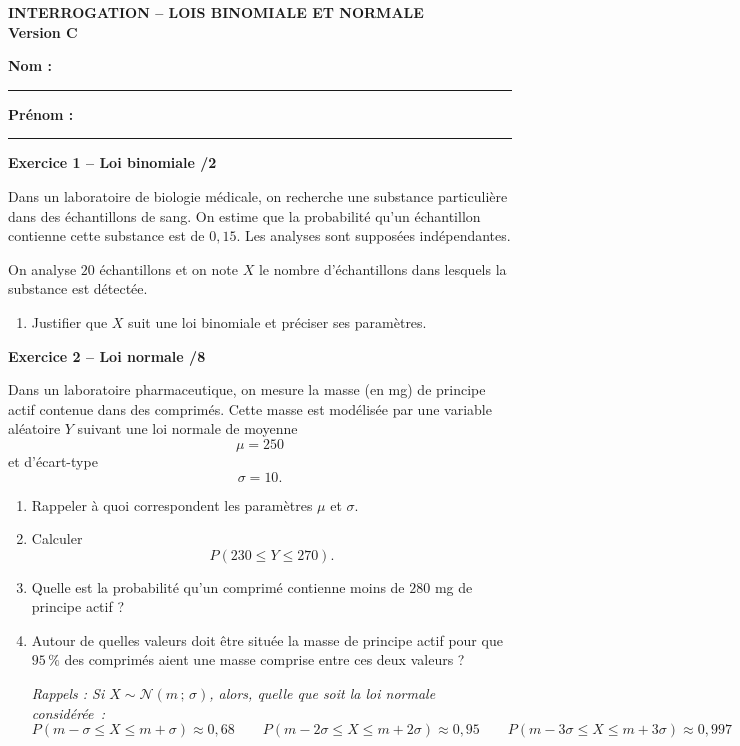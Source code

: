 \documentclass[10pt,a4paper]{article}
\newcommand{\version}[1]{
    \begin{center}
        \textbf{\large INTERROGATION -- LOIS BINOMIALE ET NORMALE}\\
        \textbf{Version #1}
    \end{center}

    \vspace{-0.1cm}

    \textbf{Nom :} \rule{5cm}{0.4pt}
    \hfill
    \textbf{Prénom :} \rule{4cm}{0.4pt}

    \vspace{0.2cm}
}
\begin{document}
\newpage


\version{C}

\textbf{Exercice 1 -- Loi binomiale \hfill /2}

Dans un laboratoire de biologie médicale, on recherche une substance
particulière dans des échantillons de sang. On estime que la probabilité
qu'un échantillon contienne cette substance est de $0,15$.
Les analyses sont supposées indépendantes.

On analyse $20$ échantillons et on note $X$ le nombre d'échantillons
dans lesquels la substance est détectée.

\begin{enumerate}[label=\arabic*.]
    \item Justifier que $X$ suit une loi binomiale et préciser ses paramètres.
\end{enumerate}



\textbf{Exercice 2 -- Loi normale \hfill /8}

Dans un laboratoire pharmaceutique, on mesure la masse (en mg) de
principe actif contenue dans des comprimés. Cette masse est modélisée
par une variable aléatoire $Y$ suivant une loi normale de moyenne
\[
\mu=250
\]
et d'écart-type
\[
\sigma=10.
\]

\begin{enumerate}[label=\arabic*.]
    \item Rappeler à quoi correspondent les paramètres $\mu$ et $\sigma$.

    \item Calculer
    \[
    P(230\leq Y\leq270).
    \]

    \item Quelle est la probabilité qu'un comprimé contienne moins de
    $280$ mg de principe actif ?

    \item Autour de quelles valeurs doit être située la masse de
    principe actif pour que $95\,\%$ des comprimés aient une masse
    comprise entre ces deux valeurs ?

        \textit{Rappels : Si $X \sim \mathcal{N}(m\,;\,\sigma)$, alors, quelle que soit la loi normale considérée~:
$$P(m-\sigma \leqslant X \leqslant m+\sigma) \approx 0{,}68 \qquad P(m-2\sigma \leqslant X \leqslant m+2\sigma) \approx 0{,}95 \qquad P(m-3\sigma \leqslant X \leqslant m+3\sigma) \approx 0{,}997$$} 
\end{enumerate}
\end{document}

